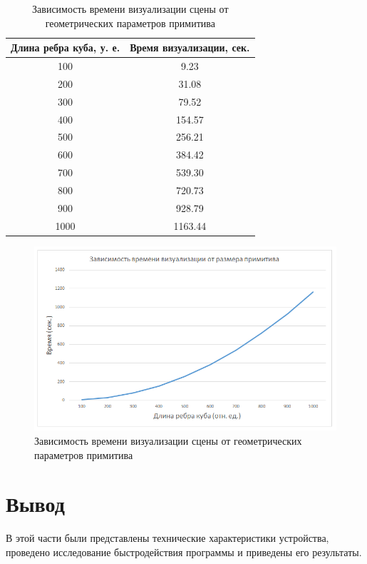 \clearpage

\begin{table}[h]
	\small
	\centering
	\caption{Зависимость времени визуализации сцены от геометрических параметров примитива}
	\begin{tabular}{|c|c|}
		\hline
		\textbf{Длина ребра куба, у. е.} & \textbf{Время визуализации, сек.} \\
		\hline
		100  & 9.23 \\
		200  & 31.08 \\
		300  & 79.52 \\
		400  & 154.57 \\
		500  & 256.21 \\
		600  & 384.42 \\
		700  & 539.30 \\
		800  & 720.73 \\
		900  & 928.79 \\
		1000 & 1163.44 \\
		\hline
	\end{tabular}
	\label{tbl:research3}
\end{table}

\begin{figure}[h] 
	\centering
	\includegraphics[width=1\textwidth]{images/research3.png}
	\caption{Зависимость времени визуализации сцены от геометрических параметров примитива} 
	\label{fig:research3} 
\end{figure}

\section{Вывод}

В этой части были представлены технические характеристики устройства,
проведено исследование быстродействия программы и приведены его результаты.

\clearpage
